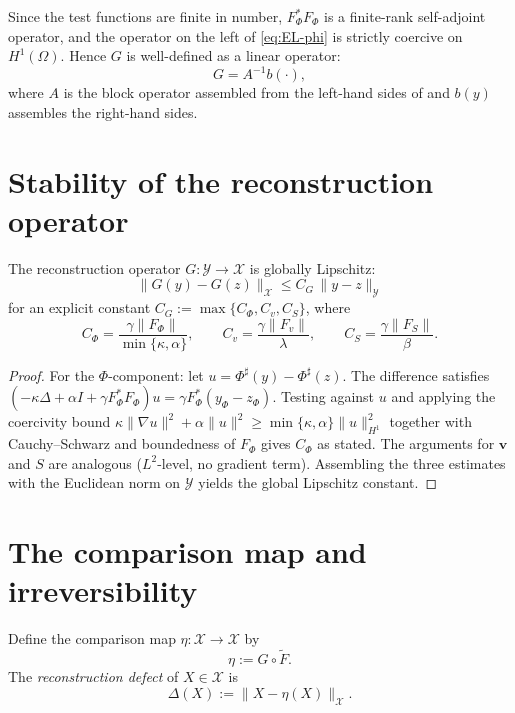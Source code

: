 \documentclass[12pt, oneside]{memoir}
\newcommand{\X}{\mathcal{X}}
\newcommand{\Ft}{\widetilde{F}}
\newcommand{\nnorm}[1]{\lVert #1 \rVert}
\newcommand{\bv}{\mathbf{v}}
\begin{document}
Since the test functions are finite in number, $F_\Phi^* F_\Phi$ is a finite-rank
self-adjoint operator, and the operator on the left of \cref{eq:EL-phi} is strictly
coercive on $H^1(\Omega)$.  Hence $G$ is well-defined as a linear operator:
\begin{equation}
  G = A^{-1} b(\cdot),
\end{equation}
where $A$ is the block operator assembled from the left-hand sides of
 and $b(y)$ assembles the right-hand sides.

\section{Stability of the reconstruction operator}

\begin{theorem}
\label{thm:lipschitz}
The reconstruction operator $G: \mathcal{Y} \to \X$ is globally Lipschitz:
\[
  \nnorm{G(y) - G(z)}_\X \le C_G\, \nnorm{y - z}_{\mathcal{Y}}
\]
for an explicit constant $C_G := \max\{C_\Phi, C_v, C_S\}$, where
\[
  C_\Phi = \frac{\gamma \nnorm{F_\Phi}}{\min\{\kappa,\alpha\}}, \qquad
  C_v   = \frac{\gamma \nnorm{F_v}}{\lambda}, \qquad
  C_S   = \frac{\gamma \nnorm{F_S}}{\beta}.
\]
\end{theorem}

\begin{proof}
For the $\Phi$-component: let $u = \Phi^\sharp(y) - \Phi^\sharp(z)$.  The difference
satisfies $(-\kappa\Delta + \alpha I + \gamma F_\Phi^*F_\Phi)u = \gamma F_\Phi^*(y_\Phi
- z_\Phi)$.  Testing against $u$ and applying the coercivity bound
$\kappa\nnorm{\nabla u}^2 + \alpha\nnorm{u}^2 \ge \min\{\kappa,\alpha\}\nnorm{u}_{H^1}^2$
together with Cauchy--Schwarz and boundedness of $F_\Phi$ gives $C_\Phi$ as stated.  The
arguments for $\bv$ and $S$ are analogous ($L^2$-level, no gradient term).  Assembling
the three estimates with the Euclidean norm on $\mathcal{Y}$ yields the global Lipschitz
constant.
\end{proof}

\section{The comparison map and irreversibility}

\begin{definition}
\label{def:eta}
Define the comparison map $\eta: \X \to \X$ by
\[
  \eta := G \circ \Ft.
\]
The \emph{reconstruction defect} of $X \in \X$ is
\[
  \Delta(X) := \nnorm{X - \eta(X)}_\X.
\]
\end{definition}
\end{document}
